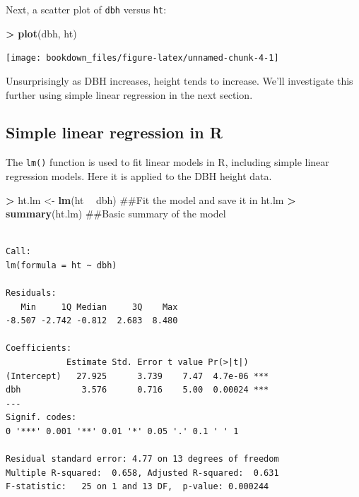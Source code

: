 \documentclass[]{krantz}
\makeatletter
\newenvironment{Shaded}{\begin{snugshade}}{\end{snugshade}}
\newcommand{\KeywordTok}[1]{\textcolor[rgb]{0.27,0.27,0.27}{\textbf{#1}}}
\newcommand{\StringTok}[1]{\textcolor[rgb]{0.5,0.5,0.5}{#1}}
\newcommand{\OperatorTok}[1]{\textcolor[rgb]{0.43,0.43,0.43}{\textbf{#1}}}
\newcommand{\NormalTok}[1]{#1}
\newenvironment{kframe}{%
\medskip{}
\setlength{\fboxsep}{.8em}
 \def\at@end@of@kframe{}%
 \ifinner\ifhmode%
  \def\at@end@of@kframe{\end{minipage}}%
  \begin{minipage}{\columnwidth}%
 \fi\fi%
 \def\FrameCommand##1{\hskip\@totalleftmargin \hskip-\fboxsep
 \colorbox{shadecolor}{##1}\hskip-\fboxsep
     \hskip-\linewidth \hskip-\@totalleftmargin \hskip\columnwidth}%
 \MakeFramed {\advance\hsize-\width
   \@totalleftmargin\z@ \linewidth\hsize
   \@setminipage}}%
 {\par\unskip\endMakeFramed%
 \at@end@of@kframe}
\renewenvironment{Shaded}{\begin{kframe}}{\end{kframe}}
\theoremstyle{definition}
\theoremstyle{definition}
\theoremstyle{definition}
\theoremstyle{remark}
\makeatother
\begin{document}
Next, a scatter plot of \texttt{dbh} versus \texttt{ht}:

\begin{Shaded}
\begin{Highlighting}[]
\OperatorTok{>}\StringTok{ }\KeywordTok{plot}\NormalTok{(dbh, ht)}
\end{Highlighting}
\end{Shaded}

\begin{center}\texttt{[image: bookdown\_files/figure-latex/unnamed-chunk-4-1]} \end{center}

Unsurprisingly as DBH increases, height tends to increase. We'll
investigate this further using simple linear regression in the next
section.

\subsection{Simple linear regression in
R}\label{simple-linear-regression-in-r}

The \texttt{lm()} function is used to fit linear models in R, including
simple linear regression models. Here it is applied to the DBH height
data.

\begin{Shaded}
\begin{Highlighting}[]
\OperatorTok{>}\StringTok{ }\NormalTok{ht.lm <-}\StringTok{ }\KeywordTok{lm}\NormalTok{(ht }\OperatorTok{~}\StringTok{ }\NormalTok{dbh)  ##Fit the model and save it in ht.lm}
\OperatorTok{>}\StringTok{ }\KeywordTok{summary}\NormalTok{(ht.lm)  ##Basic summary of the model}
\end{Highlighting}
\end{Shaded}

\begin{verbatim}

Call:
lm(formula = ht ~ dbh)

Residuals:
   Min     1Q Median     3Q    Max 
-8.507 -2.742 -0.812  2.683  8.480 

Coefficients:
            Estimate Std. Error t value Pr(>|t|)    
(Intercept)   27.925      3.739    7.47  4.7e-06 ***
dbh            3.576      0.716    5.00  0.00024 ***
---
Signif. codes:  
0 '***' 0.001 '**' 0.01 '*' 0.05 '.' 0.1 ' ' 1

Residual standard error: 4.77 on 13 degrees of freedom
Multiple R-squared:  0.658, Adjusted R-squared:  0.631 
F-statistic:   25 on 1 and 13 DF,  p-value: 0.000244
\end{verbatim}
\end{document}
